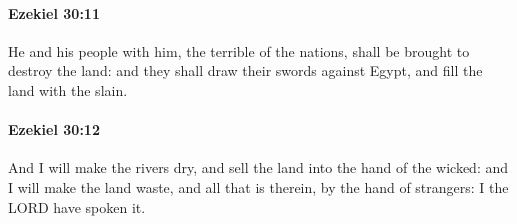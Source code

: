 		\paragraph{Ezekiel 30:11} %
			\label{EZEKIEL-30-11}

			He and his people with him, the terrible of the nations, shall be brought to destroy the land: and they shall draw their swords against Egypt, and fill the land with the slain.


		\paragraph{Ezekiel 30:12} %
			\label{EZEKIEL-30-12}

			And I will make the rivers dry, and sell the land into the hand of the wicked: and I will make the land waste, and all that is therein, by the hand of strangers: I the LORD have spoken it.



